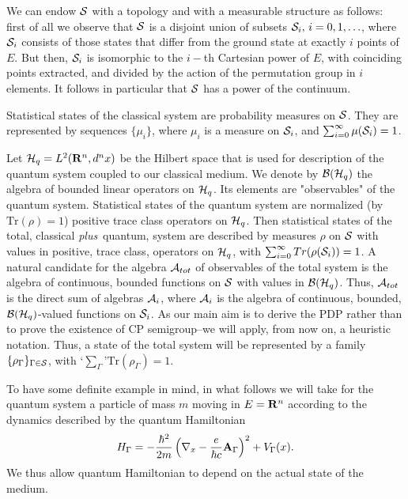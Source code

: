 \documentclass[12pt]{article}
\def\be{\begin{equation}}
\def\ee{\end{equation}}
\def\tr{\mbox{Tr}}
\begin{document}
\medskip
We can endow ${\cal S}$ with a topology and with a measurable structure as
follows: first of all we observe that ${\cal S}$ is a disjoint union of
subsets ${\cal S}_i , \, i=0,1,\ldots $, where ${\cal S}_i$ consists of
those states that differ from the ground state at exactly $i$ points of
$E$. But then, ${\cal S}_i$ is isomorphic to the $i-$th Cartesian power of
$E$, with coinciding points extracted, and divided by the action of the
permutation group in $i$ elements. It follows in particular that ${\cal S}$
has a power of the continuum.

Statistical states of the classical system are probability measures on
${\cal S}$. They are represented by sequences $\{ \mu_i \}$, where $ \mu_i$
is a measure on ${\cal S}_i$, and $\sum_{i=0}^{\infty }\mu ({\cal S}_i) =1$.

Let ${\cal H}_q= {\sl L}^2({\bf R}^n,d^n x)$ be the Hilbert space that is
used for description of the quantum system coupled to our classical medium.
We denote by ${\cal B} ({\cal H}_q )$ the algebra of bounded linear
operators on ${\cal H}_q$. Its elements are "observables" of the quantum
system. Statistical states of the quantum system are normalized (by $\tr
(\rho )=1$) positive trace class operators on ${\cal H}_q$. Then
statistical states of the total, classical {\sl plus}\, quantum, system are
described by measures $\rho $ on ${\cal S}$ with values in positive, trace
class, operators on ${\cal H}_q$, with $\sum_{i=0}^{\infty }Tr ( \rho
({\cal S}_i )) =1$. A natural candidate for the algebra ${\cal A}_{tot}$ of
observables of the total system is the algebra of continuous, bounded
functions on ${\cal S}$ with values in ${\cal B} ({\cal H}_q )$. Thus,
${\cal A}_{tot}$ is the direct sum of algebras ${\cal A}_i$, where ${\cal
A}_i$ is the algebra of continuous, bounded, ${\cal B} ({\cal
H}_q)$-valued functions on ${\cal S}_i$. As our main aim is to derive the
PDP rather than to prove the existence of CP semigroup--we will apply,
from now on, a heuristic notation. Thus, a state of the total system will
be represented by a family $\{ \rho_\Gamma \}_{\Gamma\in {\cal S}}$, with
\lq$\sum_\Gamma$\rq $\tr(\rho_\Gamma)=1$.

To have some definite example in mind, in what follows we will take for the
quantum system a particle of mass $m$ moving in $E={\bf R}^n$ according to
the dynamics described by the quantum Hamiltonian \be H_\Gamma=
-{\hbar^2\over 2m}\left({\bf\nabla}_x-{e\over {\hbar c}}{\bf A}_
\Gamma\right)^2+V_\Gamma(x). \ee We thus allow quantum Hamiltonian to
depend on the actual state of the medium.
\end{document}

